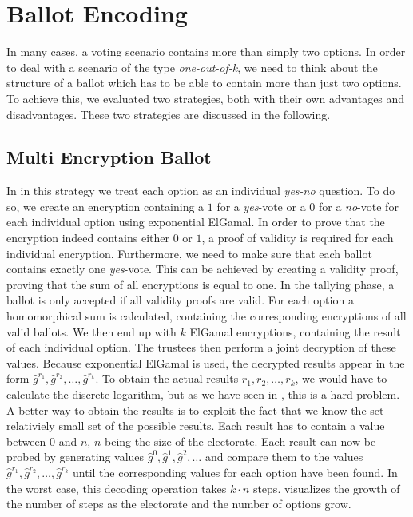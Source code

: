 \documentclass[numbers=noenddot, abstract=on, a4paper, headsepline,
footsepline, oneside, draft=off]{scrreprt}
\begin{document}
\section{Ballot Encoding}
\label{sec:ballotencoding}
In many cases, a voting scenario contains more than simply two options. In order
to deal with a scenario of the type \emph{one-out-of-k}, we need to think about
the structure of a ballot which has to be able to contain more than just two
options. To achieve this, we evaluated two strategies, both with their own
advantages and disadvantages. These two strategies are discussed in the
following.

\subsection{Multi Encryption Ballot}
\label{sec:multiencriptionballot}
In in this strategy we treat each option as an individual \emph{yes-no}
question. To do so, we create an encryption containing a $1$ for a
\emph{yes}-vote or a $0$ for a \emph{no}-vote for each individual option using
exponential ElGamal. In order to prove that the encryption indeed contains
either $0$ or $1$, a proof of validity is required for each individual
encryption.
Furthermore, we need to make sure that each ballot contains exactly one
\emph{yes}-vote. This can be achieved by creating a validity proof, proving that
the sum of all encryptions is equal to one. In the
tallying phase, a ballot is only accepted if all validity proofs are valid. For
each option a homomorphical sum is calculated, containing the corresponding
encryptions of all valid ballots. We then end up with $k$ ElGamal encryptions,
containing the result of each individual option. The trustees then perform a
joint decryption of these values. Because exponential ElGamal is used, the
decrypted results appear in the form $\hat{g}^{r_1}, \hat{g}^{r_2}, \ldots,
\hat{g}^{r_k}$. To obtain the actual results $r_1, r_2, \ldots, r_k$, we would
have to calculate the discrete logarithm, but as
we have seen in , this is a hard problem. A better
way to obtain the results is to exploit the fact that we know the set
relativiely small set of the possible results. Each result has to contain a
value between $0$ and $n$, $n$ being the size of the electorate. Each result can
now be probed by generating values $\hat{g}^0, \hat{g}^1, \hat{g}^2, \ldots$ and
compare them to the values $\hat{g}^{r_1}, \hat{g}^{r_2}, \ldots,
\hat{g}^{r_k}$ until the corresponding values for each option have been found.
In the worst case, this decoding operation takes $k \cdot n$ steps.
 visualizes the growth of the number
of steps as the electorate and the number of options grow.
\end{document}
